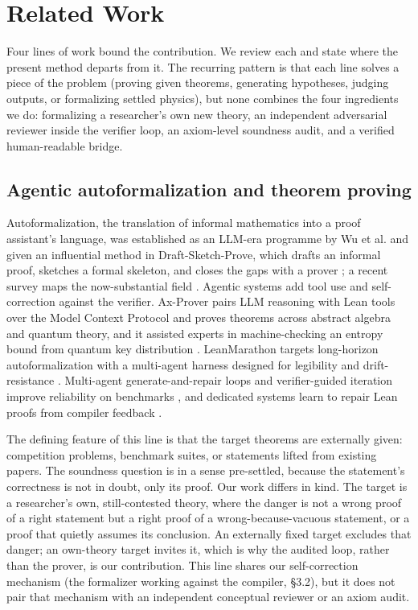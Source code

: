 \documentclass[11pt]{article}
\begin{document}
\section{Related Work}

Four lines of work bound the contribution. We review each and state where the present method
departs from it. The recurring pattern is that each line solves a piece of the problem (proving
given theorems, generating hypotheses, judging outputs, or formalizing settled physics), but none
combines the four ingredients we do: formalizing a researcher's own new theory, an independent
adversarial reviewer inside the verifier loop, an axiom-level soundness audit, and a verified
human-readable bridge.

\subsection{Agentic autoformalization and theorem proving}

Autoformalization, the translation of informal mathematics into a proof assistant's language, was
established as an LLM-era programme by Wu et al. \cite{r8} and given an influential method in
Draft-Sketch-Prove, which drafts an informal proof, sketches a formal skeleton, and closes the gaps
with a prover \cite{r9}; a recent survey maps the now-substantial field \cite{r10}. Agentic systems add tool
use and self-correction against the verifier. Ax-Prover pairs LLM reasoning with Lean tools over the
Model Context Protocol and proves theorems across abstract algebra and quantum theory, and it
assisted experts in machine-checking an entropy bound from quantum key distribution \cite{r12}.
LeanMarathon targets long-horizon autoformalization with a multi-agent harness designed for
legibility and drift-resistance \cite{r13}. Multi-agent generate-and-repair loops and verifier-guided
iteration improve reliability on benchmarks \cite{r14,r15}, and dedicated systems learn to repair Lean
proofs from compiler feedback \cite{r16}.

The defining feature of this line is that the target theorems are externally given: competition
problems, benchmark suites, or statements lifted from existing papers. The soundness question is in
a sense pre-settled, because the statement's correctness is not in doubt, only its proof. Our work
differs in kind. The target is a researcher's own, still-contested theory, where the danger is not
a wrong proof of a right statement but a right proof of a wrong-because-vacuous statement, or a
proof that quietly assumes its conclusion. An externally fixed target excludes that danger; an
own-theory target invites it, which is why the audited loop, rather than the prover, is our
contribution. This line shares our self-correction mechanism (the formalizer working against the
compiler, §3.2), but it does not pair that mechanism with an independent conceptual reviewer or an
axiom audit.
\end{document}
